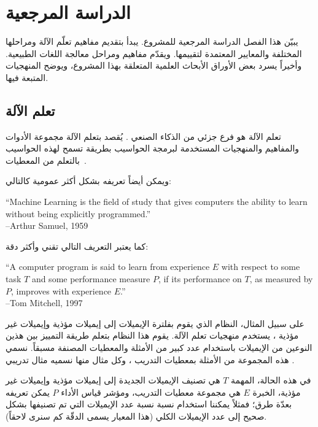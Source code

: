 

\chapter{الدراسة المرجعية}
يبيّن هذا الفصل الدراسة المرجعية للمشروع.
يبدأ بتقديم مفاهيم تعلّم الآلة ومراحلها المختلفة والمعايير المعتمدة لتقييمها.
ويقدّم مفاهيم ومراحل معالجة اللغات الطبيعية.
وأخيراً يسرد بعض الأوراق الأبحاث العلمية المتعلقة بهذا المشروع، ويوضح المنهجيات المتبعة فيها.

\section{تعلم الآلة}
تعلم الآلة  هو فرع جزئي من الذكاء الصنعي .
يُقصد بتعلم الآلة مجموعة الأدوات والمفاهيم والمنهجيات المستخدمة لبرمجة الحواسيب
بطريقة تسمح لهذه الحواسيب بالتعلم من المعطيات~\cite{hands-on}.

ويمكن أيضاً تعريفه بشكل أكثر عمومية كالتالي:

\begin{english}
	``Machine Learning is the field of study that gives computers the ability to learn
	without being explicitly programmed.'' \\
	--Arthur Samuel, 1959
\end{english}

كما يعتبر التعريف التالي تقني وأكثر دقة:

\begin{english}
	``A computer program is said to learn from experience $E$ with respect to some task $T$
	and some performance measure $P$, if its performance on $T$, as measured by $P$, improves
	with experience $E$.'' \\
	--Tom Mitchell, 1997
\end{english}

على سبيل المثال، النظام الذي يقوم بفلترة الإيميلات إلى إيميلات مؤذية  وإيميلات غير مؤذية ، يستخدم منهجيات تعلم الآلة.
يقوم هذا النظام بتعلم طريقة التمييز بين هذين النوعين من الإيميلات باستخدام عدد كبير من الأمثلة والمعطيات المصنفة مسبقاً.
نسمي هذه المجموعة من الأمثلة بمعطيات التدريب ، وكل مثال منها نسميه مثال تدريبي .

في هذه الحالة، المهمة $T$ هي تصنيف الإيميلات الجديدة إلى إيميلات مؤذية وإيميلات غير مؤذية، الخبرة $E$ هي مجموعة معطيات التدريب،
ومؤشر قياس الأداء $P$ يمكن تعريفه بعدّة طرق؛ فمثلاً يمكننا استخدام نسبة نسبة عدد الإيميلات التي تم تصنيفها بشكل صحيح إلى عدد الإيميلات الكلي
(هذا المعيار يسمى الدقّة  كم سنرى لاحقاً).

